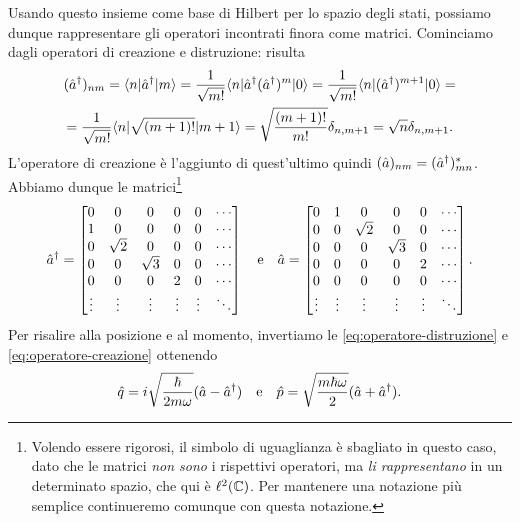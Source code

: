 Usando questo insieme come base di Hilbert per lo spazio degli stati, possiamo dunque rappresentare gli operatori incontrati finora come matrici.
Cominciamo dagli operatori di creazione e distruzione: risulta
\begin{multline}
	(\hat{a}^\dagger)_{nm}=\langle n\rvert\hat{a}^\dagger\lvert m\rangle=\frac1{\sqrt{m!}}\langle n\rvert\hat{a}^\dagger(\hat{a}^\dagger)^m\lvert0\rangle=\frac1{\sqrt{m!}}\langle n\rvert(\hat{a}^\dagger)^{m+1}\lvert0\rangle=\\
	=\frac1{\sqrt{m!}}\langle n\rvert\sqrt{(m+1)!}\lvert m+1\rangle=\sqrt{\frac{(m+1)!}{m!}}\delta_{n,m+1}=\sqrt{n}\delta_{n,m+1}.
	\label{eq:matrice-operatore-creazione-oscillatore}
\end{multline}
L'operatore di creazione è l'aggiunto di quest'ultimo quindi $(\hat{a})_{nm}=(\hat{a}^\dagger)_{mn}^*$.
Abbiamo dunque le matrici\footnote{Volendo essere rigorosi, il simbolo di uguaglianza è sbagliato in questo caso, dato che le matrici \emph{non sono} i rispettivi operatori, ma \emph{li rappresentano} in un determinato spazio, che qui è $\ell^2(\mathbb{C})$. Per mantenere una notazione più semplice continueremo comunque con questa notazione.}
\begin{equation}
	\hat{a}^\dagger=
	\begin{bmatrix}
		0		&0			&0			&0		&0		&\cdots\\
		1		&0			&0			&0		&0		&\cdots\\
		0		&\sqrt{2}	&0			&0		&0		&\cdots\\
		0		&0			&\sqrt{3}	&0		&0		&\cdots\\
		0		&0			&0			&2		&0		&\cdots\\
		\vdots	&\vdots		&\vdots		&\vdots	&\vdots	&\ddots
	\end{bmatrix}
	\quad\text{e}\quad
	\hat{a}=
	\begin{bmatrix}
		0		&1			&0			&0			&0			&\cdots\\
		0		&0			&\sqrt{2}	&0			&0			&\cdots\\
		0		&0			&0			&\sqrt{3}	&0			&\cdots\\
		0		&0			&0			&0			&2			&\cdots\\
		0		&0			&0			&0			&0			&\cdots\\
		\vdots	&\vdots		&\vdots		&\vdots		&\vdots		&\ddots
	\end{bmatrix}.
	\label{eq:matrici-operatori-scala-oscillatore}
\end{equation}
Per risalire alla posizione e al momento, invertiamo le \eqref{eq:operatore-distruzione} e \eqref{eq:operatore-creazione} ottenendo
\begin{equation}
	\hat{q}=i\sqrt{\frac{\hbar}{2m\omega}}(\hat{a}-\hat{a}^\dagger)\quad\text{e}\quad\hat{p}=\sqrt{\frac{m\hbar\omega}2}(\hat{a}+\hat{a}^\dagger).
\end{equation}
